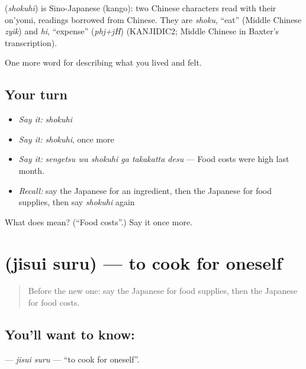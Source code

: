 \begin{cousinweb}
\textbf{} (\emph{shokuhi}) is Sino-Japanese (kango): two Chinese characters read with their on'yomi, readings borrowed from Chinese. They are \emph{shoku}, \textquotedblleft{}eat\textquotedblright{} (Middle Chinese \emph{zyik}) and \emph{hi}, \textquotedblleft{}expense\textquotedblright{} (\emph{phj+jH}) (KANJIDIC2; Middle Chinese in Baxter's transcription).
\end{cousinweb}

\begin{grammarlens}[title={What you've built}]
One more word for describing what you lived and felt.
\end{grammarlens}

\subsection*{Your turn}
\begin{itemize}
\raggedright
  \item \emph{Say it:} \emph{shokuhi}
  \item \emph{Say it:} \emph{shokuhi}, once more
  \item \emph{Say it:} \emph{sengetsu wa shokuhi ga takakatta desu} — Food costs were high last month.
  \item \emph{Recall:} say the Japanese for an ingredient, then the Japanese for food supplies, then say \emph{shokuhi} again
\end{itemize}

\begin{tcolorbox}[breakable,colback=teal!4,colframe=teal!35!black,title={Before you move on}]
What does  mean? (\textquotedblleft{}Food costs\textquotedblright{}.) Say it once more.
\end{tcolorbox}
\section[\texorpdfstring{\ja{じすいする} (jisui suru)}{じすいする (jisui suru)}]{ (jisui suru) — to cook for oneself}

\label{lesson:JA-C497-jisui-suru}



\begin{quote}
Before the new one: say the Japanese for food supplies, then the Japanese for food costs.
\end{quote}

\subsection*{You'll want to know: }
\textbf{} — \emph{jisui suru} — \textquotedblleft{}to cook for oneself\textquotedblright{}.

